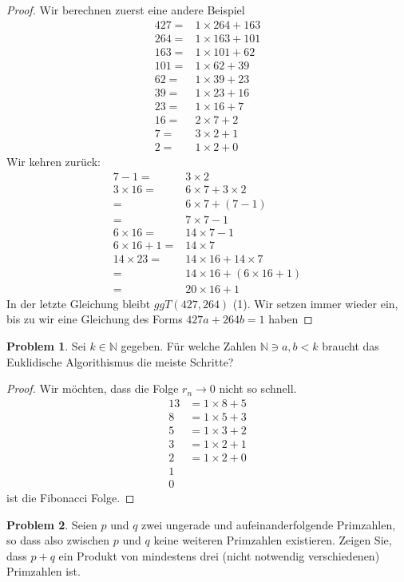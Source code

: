 \documentclass[prb,12pt]{revtex4-2}
\theoremstyle{definition}
\newtheorem{Problem}{Problem}
\theoremstyle{definition}
\newcommand{\N}{\mathbb{N}}
\begin{document}
\begin{proof}
	Wir berechnen zuerst eine andere Beispiel
	\begin{align*}
		427=&1\times 264+163\\
		264=&1\times 163+101\\
		163=&1\times 101+62\\
		101=&1\times 62+39\\
		62=&1\times 39+23\\
		39=&1\times 23+16\\
		23=&1\times 16+7\\
		16=&2\times 7+2\\
		7=&3\times 2+1\\
		2=&1\times 2 +0
	\end{align*}
	Wir kehren zur\"{u}ck:
	\begin{align*}
		7-1=&3\times 2\\
		3\times 16=&6\times 7 +3\times 2\\
		=&6\times 7+(7 - 1)\\
		=&7\times 7-1\\
		6\times 16 =& 14\times 7-1\\
		6\times 16+1=& 14\times 7\\
		14\times 23 =& 14\times 16+14\times 7\\
		=& 14\times 16+(6\times 16+1)\\
		=& 20\times 16 +1
	\end{align*}
	In der letzte Gleichung bleibt $ggT(427,264)$ (1). Wir setzen immer wieder ein, bis zu wir eine Gleichung des Forms $427a+264b=1$ haben
\end{proof}
\begin{Problem}
	Sei $k\in\N$ gegeben. F\"{u}r welche Zahlen $\N\ni a,b<k$ braucht das Euklidische Algorithismus die meiste Schritte?
\end{Problem}
\begin{proof}
Wir möchten, dass die Folge $r_n\to 0$ nicht so schnell. 
	\begin{align*}
		13&=1\times 8+5\\
		8&=1\times 5+3\\
		5&=1\times 3 +2\\
		3&=1\times 2 +1\\
		2&=1\times 2+0\\
		1&\\
		0&
	\end{align*}
	ist die Fibonacci Folge.
\end{proof}
\begin{Problem}
	Seien $p$ und $q$ zwei ungerade und aufeinanderfolgende Primzahlen, so dass also zwischen $p$ und $q$ keine weiteren Primzahlen existieren. Zeigen Sie, dass $p + q$ ein Produkt von mindestens drei (nicht notwendig verschiedenen) Primzahlen ist.
\end{Problem}
\end{document}
